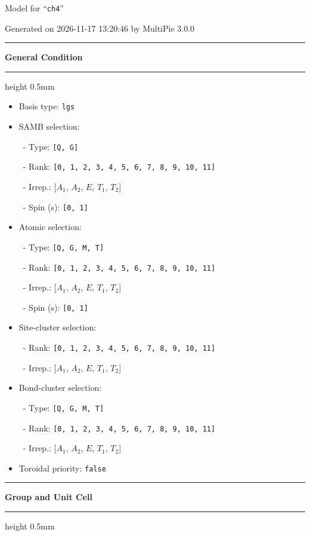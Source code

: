 \documentclass[fleqn,10pt,landscape]{jsarticle}
\begin{document}
\setcounter{MaxMatrixCols}{32}

\renewcommand{\tablename}{Table~}
\renewcommand{\figurename}{Figure~}
\setlength{\baselineskip}{16pt}
\setlength{\parindent}{0pt}
\setlength{\mathindent}{0pt}
\footnotesize
\begin{center}
\LARGE
Model for ``\texttt{ch4}''
\end{center}
\begin{flushright}
Generated on 2026-11-17 13:20:46 by MultiPie 3.0.0
\end{flushright}
\setlength{\baselineskip}{16pt}
\footnotesize
\vspace{5mm}
\noindent \rule[0.5mm]{5mm}{0.5mm}\hspace{3mm}\textbf{General Condition}\hspace{3mm}\leaders\hrule height 0.5mm\hfill\kern0pt
\vspace{3mm}

\begin{itemize}
\item Basis type: \texttt{lgs}

\item SAMB selection:

\, - Type: \texttt{[Q, G]}

\, - Rank: \texttt{[0, 1, 2, 3, 4, 5, 6, 7, 8, 9, 10, 11]}

\, - Irrep.: [$A_{1}$, $A_{2}$, $E$, $T_{1}$, $T_{2}$]

\, - Spin (s): \texttt{[0, 1]}

\item Atomic selection:

\, - Type: \texttt{[Q, G, M, T]}

\, - Rank: \texttt{[0, 1, 2, 3, 4, 5, 6, 7, 8, 9, 10, 11]}

\, - Irrep.: [$A_{1}$, $A_{2}$, $E$, $T_{1}$, $T_{2}$]

\, - Spin (s): \texttt{[0, 1]}

\item Site-cluster selection:

\, - Rank: \texttt{[0, 1, 2, 3, 4, 5, 6, 7, 8, 9, 10, 11]}

\, - Irrep.: [$A_{1}$, $A_{2}$, $E$, $T_{1}$, $T_{2}$]

\item Bond-cluster selection:

\, - Type: \texttt{[Q, G, M, T]}

\, - Rank: \texttt{[0, 1, 2, 3, 4, 5, 6, 7, 8, 9, 10, 11]}

\, - Irrep.: [$A_{1}$, $A_{2}$, $E$, $T_{1}$, $T_{2}$]

\item Toroidal priority: \texttt{false}

\end{itemize}
\vspace{5mm}
\noindent \rule[0.5mm]{5mm}{0.5mm}\hspace{3mm}\textbf{Group and Unit Cell}\hspace{3mm}\leaders\hrule height 0.5mm\hfill\kern0pt
\vspace{3mm}
\end{document}
